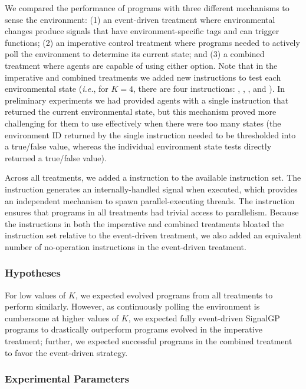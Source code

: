 We compared the performance of programs with three different mechanisms to sense the environment: 
(1) an event-driven treatment where environmental changes produce signals that have environment-specific tags and can trigger functions; 
(2) an imperative control treatment where programs needed to actively poll the environment to determine its current state; 
and (3) a combined treatment where agents are capable of using either option.  
Note that in the imperative and combined treatments we added new instructions to test each environmental state (\textit{i.e.}, for $K=4$, there are four instructions: , , , and ). 
In preliminary experiments we had provided agents with a single instruction that returned the current environmental state, but this mechanism proved more challenging for them to use effectively when there were too many states (the environment ID returned by the single instruction needed to be thresholded into a true/false value, whereas the individual environment state tests directly returned a true/false value). 

Across all treatments, we added a  instruction to the available instruction set. 
The  instruction generates an internally-handled signal when executed, which provides an independent mechanism to spawn parallel-executing threads. 
The  instruction ensures that programs in all treatments had trivial access to parallelism. 
Because the  instructions in both the imperative and combined treatments bloated the instruction set relative to the event-driven treatment, we also added an equivalent number of no-operation instructions in the event-driven treatment.

\subsubsection{Hypotheses}

For low values of $K$, we expected evolved programs from all treatments to perform similarly. 
However, as continuously polling the environment is cumbersome at higher values of $K$, we expected fully event-driven SignalGP programs to drastically outperform programs evolved in the imperative treatment; further, we expected successful programs in the combined treatment to favor the event-driven strategy. 

\subsubsection{Experimental Parameters}

